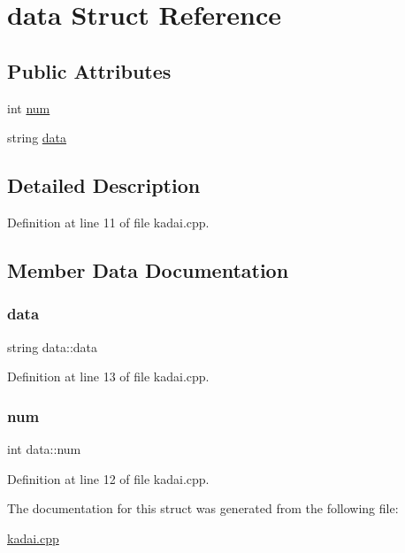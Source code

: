 \hypertarget{structdata}{}\section{data Struct Reference}
\label{structdata}
\subsection*{Public Attributes}
\begin{DoxyCompactItemize}
\item 
int \hyperlink{structdata_a2aee730d4622a534e28616b789402a06}{num}
\item 
string \hyperlink{structdata_a81968760a8778cdbf1823851e20d6f83}{data}
\end{DoxyCompactItemize}


\subsection{Detailed Description}


Definition at line 11 of file kadai.\+cpp.



\subsection{Member Data Documentation}
\mbox{\label{structdata_a81968760a8778cdbf1823851e20d6f83}} 
\subsubsection{\texorpdfstring{data}{data}}
{\footnotesize\ttfamily string data\+::data}



Definition at line 13 of file kadai.\+cpp.

\mbox{\label{structdata_a2aee730d4622a534e28616b789402a06}} 
\subsubsection{\texorpdfstring{num}{num}}
{\footnotesize\ttfamily int data\+::num}



Definition at line 12 of file kadai.\+cpp.



The documentation for this struct was generated from the following file\+:\begin{DoxyCompactItemize}
\item 
\hyperlink{kadai_8cpp}{kadai.\+cpp}\end{DoxyCompactItemize}
